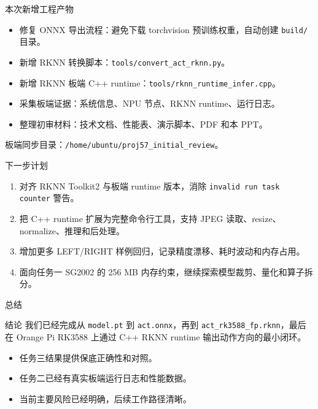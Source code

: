 \documentclass[aspectratio=169,11pt]{ctexbeamer}
\newcommand{\code}[1]{\texttt{\small #1}}
\begin{document}
\begin{frame}{本次新增工程产物}
  \begin{itemize}
    \item 修复 ONNX 导出流程：避免下载 torchvision 预训练权重，自动创建 \code{build/} 目录。
    \item 新增 RKNN 转换脚本：\code{tools/convert\_act\_rknn.py}。
    \item 新增 RKNN 板端 C++ runtime：\code{tools/rknn\_runtime\_infer.cpp}。
    \item 采集板端证据：系统信息、NPU 节点、RKNN runtime、运行日志。
    \item 整理初审材料：技术文档、性能表、演示脚本、PDF 和本 PPT。
  \end{itemize}
  \vspace{0.3em}
  \small 板端同步目录：\code{/home/ubuntu/proj57\_initial\_review}。
\end{frame}

\begin{frame}{下一步计划}
  \begin{enumerate}
    \item 对齐 RKNN Toolkit2 与板端 runtime 版本，消除 \code{invalid run task counter} 警告。
    \item 把 C++ runtime 扩展为完整命令行工具，支持 JPEG 读取、resize、normalize、推理和后处理。
    \item 增加更多 LEFT/RIGHT 样例回归，记录精度漂移、耗时波动和内存占用。
    \item 面向任务一 SG2002 的 256 MB 内存约束，继续探索模型裁剪、量化和算子拆分。
  \end{enumerate}
\end{frame}

\begin{frame}{总结}
  \begin{block}{结论}
    我们已经完成从 \code{model.pt} 到 \code{act.onnx}，再到 \code{act\_rk3588\_fp.rknn}，最后在 Orange Pi RK3588 上通过 C++ RKNN runtime 输出动作方向的最小闭环。
  \end{block}
  \begin{itemize}
    \item 任务三结果提供保底正确性和对照。
    \item 任务二已经有真实板端运行日志和性能数据。
    \item 当前主要风险已经明确，后续工作路径清晰。
  \end{itemize}
\end{frame}
\end{document}
